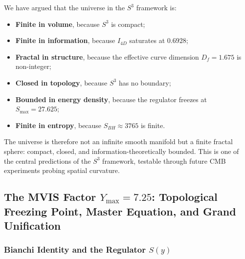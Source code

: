 \documentclass[a4paper,7pt,oneside,openany]{book}
\begin{document}
We have argued that the universe in the $S^{3}$ framework is:
\begin{itemize}
\item \textbf{Finite in volume}, because $S^{3}$ is compact;
\item \textbf{Finite in information}, because $I_{4D}$ saturates 
at $0.6928$;
\item \textbf{Fractal in structure}, because the effective 
curve dimension $D_{f}=1.675$ is non-integer;
\item \textbf{Closed in topology}, because $S^{3}$ has no 
boundary;
\item \textbf{Bounded in energy density}, because the regulator 
freezes at $S_{\max}=27.625$;
\item \textbf{Finite in entropy}, because $S_{BH}\approx 3765$ 
is finite.
\end{itemize}
The universe is therefore not an infinite smooth manifold but 
a finite fractal sphere: compact, closed, and 
information-theoretically bounded. This is one of the central 
predictions of the $S^{3}$ framework, testable through future 
CMB experiments probing spatial curvature.
\subsection{The MVIS Factor \(Y_{\max} = 7.25\): Topological Freezing Point, Master Equation, and Grand Unification}
\label{sub:mvis_unification}

\subsubsection{Bianchi Identity and the Regulator \(S(y)\)}
\label{sssec:bianchi_regulator}
\end{document}
